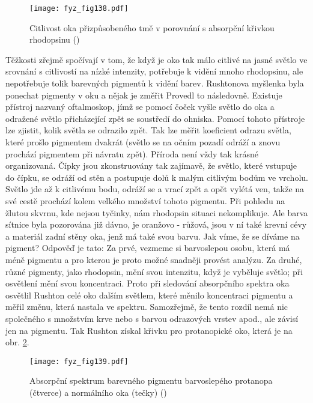 {    \begin{figure}[ht!]  %
      \centering
      \texttt{[image: fyz\_fig138.pdf]}
      \caption{Citlivost oka přizpůsobeného tmě v porovnání s absorpční křivkou rhodopsinu
              (\cite[s.~478]{Feynman01})}
      \label{fyz:fig138}
    \end{figure} 

    Těžkosti zřejmě spočívají v tom, že když je oko tak málo citlivé na jasné světlo ve srovnání s 
    citlivostí na nízké intenzity, potřebuje k vidění mnoho rhodopsinu, ale nepotřebuje tolik 
    barevných pigmentů k vidění barev. Rushtonova myšlenka byla ponechat pigmenty v oku a nějak je 
    změřit Provedl to následovně. Existuje přístroj nazvaný oftalmoskop, jímž se pomocí čoček vyšle 
    světlo do oka a odražené světlo přicházející zpět se soustředí do ohniska. Pomocí tohoto 
    přístroje lze zjistit, kolik světla se odrazilo zpět. Tak lze měřit koeficient odrazu světla, 
    které prošlo pigmentem dvakrát (světlo se na očním pozadí odráží a znovu prochází pigmentem 
    při návratu zpět). Příroda není vždy tak krásné organizovaná. Čípky jsou zkonstruovány tak 
    zajímavě, že světlo, které vstupuje do čípku, se odráží od stěn a postupuje dolů k malým 
    citlivým bodům ve vrcholu. Světlo jde až k citlivému bodu, odráží se a vrací zpět a opět vylétá 
    ven, takže na své cestě prochází kolem velkého množství tohoto pigmentu. Při pohledu na žlutou 
    skvrnu, kde nejsou tyčinky, nám rhodopsin situaci nekomplikuje. Ale barva sítnice byla 
    pozorována již dávno, je oranžovo - růžová, jsou v ní také krevní cévy a materiál zadní stěny 
    oka, jenž má také svou barvu. Jak víme, že se díváme na pigment? Odpověď je tato: Za prvé, 
    vezmeme si barvoslepou osobu, která má méně pigmentu a pro kterou je proto možné snadněji 
    provést analýzu. Za druhé, různé pigmenty, jako rhodopsin, mění svou intenzitu, když je 
    vyběluje světlo; při osvětlení mění svou koncentraci. Proto při sledování absorpčního spektra 
    oka osvětlil Rushton celé oko dalším světlem, které měnilo koncentraci pigmentu a měřil změnu, 
    která nastala ve spektru. Samozřejmě, že tento rozdíl nemá nic společného s množstvím krve nebo 
    s barvou odrazových vrstev apod., ale závisí jen na pigmentu. Tak Rushton získal křivku pro 
    protanopické oko, která je na obr. \ref{fyz:fig139}.

    \begin{figure}[ht!]  %
      \centering
      \texttt{[image: fyz\_fig139.pdf]}
      \caption{Absorpční spektrum barevného pigmentu barvoslepého protanopa (čtverce) a normálního 
               oka (tečky)
              (\cite[s.~479]{Feynman01})}
      \label{fyz:fig139}
    \end{figure} 
    
}
